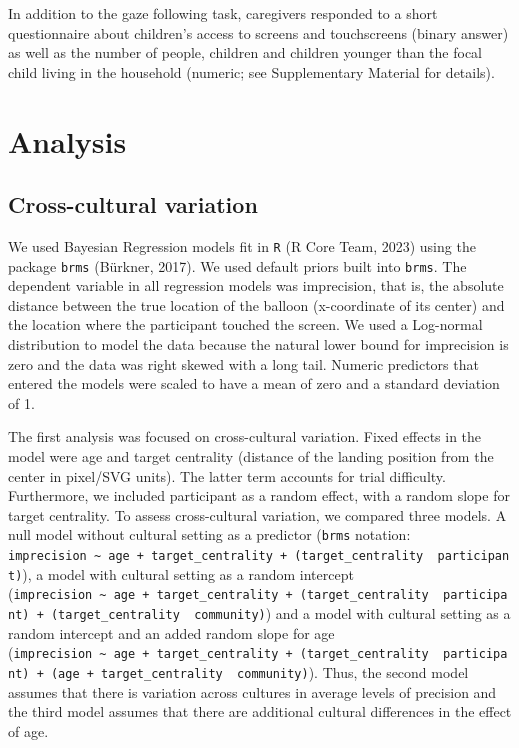 \documentclass[
  man,floatsintext]{apa7}
\begin{document}
In addition to the gaze following task, caregivers responded to a short questionnaire about children's access to screens and touchscreens (binary answer) as well as the number of people, children and children younger than the focal child living in the household (numeric; see Supplementary Material for details).

\hypertarget{analysis}{%
\section{Analysis}\label{analysis}}

\hypertarget{cross-cultural-variation}{%
\subsection{Cross-cultural variation}\label{cross-cultural-variation}}

We used Bayesian Regression models fit in \texttt{R} (R Core Team, 2023) using the package \texttt{brms} (Bürkner, 2017). We used default priors built into \texttt{brms}. The dependent variable in all regression models was imprecision, that is, the absolute distance between the true location of the balloon (x-coordinate of its center) and the location where the participant touched the screen. We used a Log-normal distribution to model the data because the natural lower bound for imprecision is zero and the data was right skewed with a long tail. Numeric predictors that entered the models were scaled to have a mean of zero and a standard deviation of 1.

The first analysis was focused on cross-cultural variation. Fixed effects in the model were age and target centrality (distance of the landing position from the center in pixel/SVG units). The latter term accounts for trial difficulty. Furthermore, we included participant as a random effect, with a random slope for target centrality. To assess cross-cultural variation, we compared three models. A null model without cultural setting as a predictor (\texttt{brms} notation: \texttt{imprecision\ \textasciitilde{}\ age\ +\ target\_centrality\ +\ (target\_centrality\ \textbar{}\ participant)}), a model with cultural setting as a random intercept (\texttt{imprecision\ \textasciitilde{}\ age\ +\ target\_centrality\ +\ (target\_centrality\ \textbar{}\ participant)\ +\ (target\_centrality\ \textbar{}\ community)}) and a model with cultural setting as a random intercept and an added random slope for age (\texttt{imprecision\ \textasciitilde{}\ age\ +\ target\_centrality\ +\ (target\_centrality\ \textbar{}\ participant)\ +\ (age\ +\ target\_centrality\ \textbar{}\ community)}). Thus, the second model assumes that there is variation across cultures in average levels of precision and the third model assumes that there are additional cultural differences in the effect of age.
\end{document}
